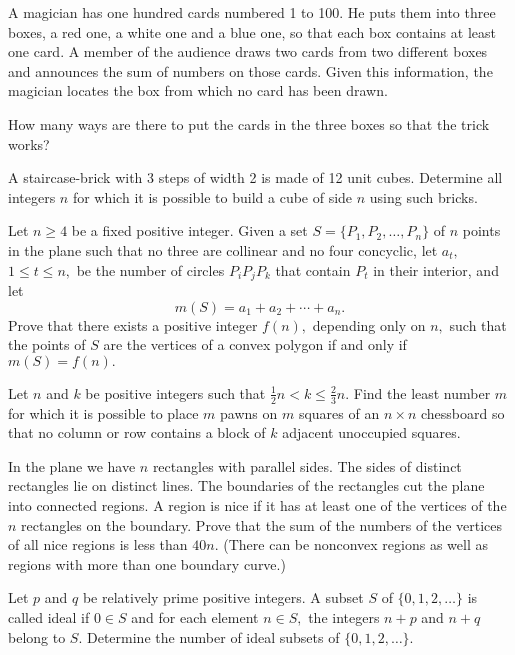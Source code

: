 \item[\textbf{C1.}]A magician has one hundred cards numbered 1 to 100. He puts them into three boxes, a red one, a white one and a blue one, so that each box contains at least one card. A member of the audience draws two cards from two different boxes and announces the sum of numbers on those cards. Given this information, the magician locates the box from which no card has been drawn.

How many ways are there to put the cards in the three boxes so that the trick works?

\item[\textbf{C2.}]A staircase-brick with 3 steps of width 2 is made of 12 unit cubes. Determine all integers $ n$ for which it is possible to build a cube of side $ n$ using such bricks.

\item[\textbf{C3.}]Let $ n \geq 4$ be a fixed positive integer. Given a set $ S = \{P_1, P_2, \ldots, P_n\}$ of $ n$ points in the plane such that no three are collinear and no four concyclic, let $ a_t,$ $ 1 \leq t \leq n,$ be the number of circles $ P_iP_jP_k$ that contain $ P_t$ in their interior, and let \[m(S)=a_1+a_2+\cdots + a_n.\]Prove that there exists a positive integer $ f(n),$ depending only on $ n,$ such that the points of $ S$ are the vertices of a convex polygon if and only if $ m(S) = f(n).$

\item[\textbf{C4.}]Let $ n$ and $ k$ be positive integers such that $ \frac{1}{2} n < k \leq \frac{2}{3} n.$ Find the least number $ m$ for which it is possible to place $ m$ pawns on $ m$ squares of an $ n \times n$ chessboard so that no column or row contains a block of $ k$ adjacent unoccupied squares.

\item[\textbf{C5.}]In the plane we have $n$ rectangles with parallel sides.  The sides of distinct rectangles lie on distinct lines.  The boundaries of the rectangles cut the plane into connected regions.  A region is nice if it has at least one of the vertices of the $n$ rectangles on the boundary.  Prove that the sum of the numbers of the vertices of all nice regions is less than $40n$.  (There can be nonconvex regions as well as regions with more than one boundary curve.)

\item[\textbf{C6.}]Let $ p$ and $ q$ be relatively prime positive integers. A subset $ S$ of $ \{0, 1, 2, \ldots \}$ is called ideal if $ 0 \in S$ and for each element $ n \in S,$ the integers $ n + p$ and $ n + q$ belong to $ S.$ Determine the number of ideal subsets of $ \{0, 1, 2, \ldots \}.$